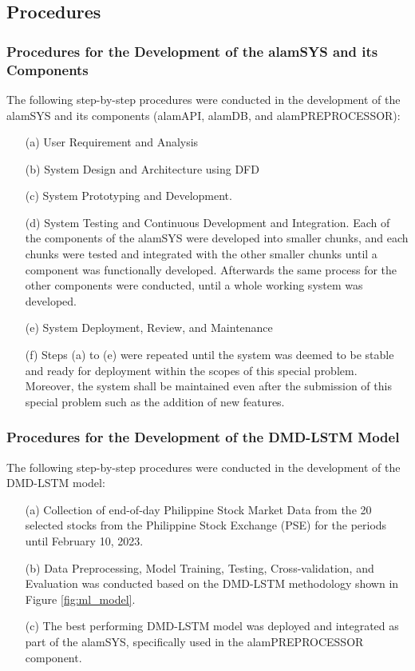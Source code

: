 \subsection{Procedures}
\label{subsec:procedures}

\subsubsection{Procedures for the Development of the alamSYS and its Components}
\label{subsubsec:proc_alamSYS}
The following step-by-step procedures were conducted in the development
of the alamSYS and its components (alamAPI, alamDB, and alamPREPROCESSOR):
\begin{itemize}
    \item[(a)] User Requirement and Analysis
    \item[(b)] System Design and Architecture using DFD
    \item[(c)] System Prototyping and Development.
    \item[(d)] System Testing and Continuous Development and Integration.
    Each of the components of the alamSYS were developed into smaller chunks,
    and each chunks were tested and integrated with the other smaller chunks
    until a component was functionally developed. Afterwards the same process for
    the other components were conducted, until a whole working system was developed.
    \item[(e)] System Deployment, Review, and Maintenance
    \item[(f)] Steps (a) to (e) were repeated until the system was deemed
    to be stable and ready for deployment within the scopes of this special
    problem. Moreover, the system shall be maintained even after the submission
    of this special problem such as the addition of new features.
\end{itemize}

\subsubsection{Procedures for the Development of the DMD-LSTM Model}
\label{subsubsec:proc_dmdlstm}
The following step-by-step procedures were conducted in the development
of the DMD-LSTM model:
\begin{itemize}
    \item[(a)] Collection of end-of-day Philippine Stock Market Data from the
    20 selected stocks from the Philippine Stock Exchange (PSE) for the periods
    until February 10, 2023.
    \item[(b)] Data Preprocessing, Model Training, Testing, Cross-validation, and Evaluation
    was conducted based on the DMD-LSTM methodology shown in Figure \ref{fig:ml_model}.
    \item[(c)] The best performing DMD-LSTM model was deployed and integrated as part 
    of the alamSYS, specifically used in the alamPREPROCESSOR component.
\end{itemize}

